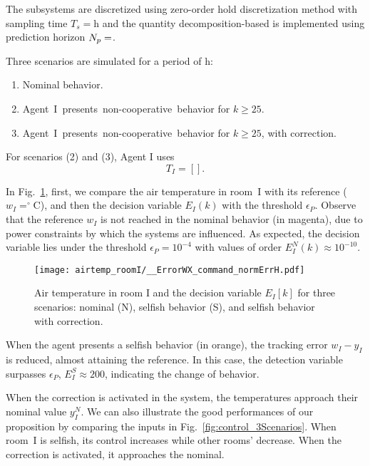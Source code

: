 \documentclass{ifacconf}  %
\begin{document}
The subsystems are discretized using zero-order hold discretization method with sampling time
${T_{s}=\mathrm{h}}$
and the quantity decomposition-based \dmpc{} is implemented using prediction horizon ${N_{p}=}$.

Three scenarios are simulated for a period of $\mathrm{h}$:

  \begin{enumerate}
    \item Nominal behavior.
    \item \mbox{Agent I presents non-cooperative behavior} for ${k\geq25}$.
    \item \mbox{Agent I presents non-cooperative behavior} for ${k\geq25}$, with correction.
  \end{enumerate}

  For scenarios (2) and (3), Agent I uses
  $$T_{I}=\left[\right].$$

In Fig.~\ref{fig:response3Scenarios}, first, we compare the air temperature in room~I
with its reference (${w_{I}=^{\circ}}$C), and then the
decision variable ${E_{I}(k)}$ with the threshold $\epsilon_{P}$.
Observe that the reference $w_{I}$ is not reached in the nominal behavior (in magenta),
due to power constraints by which the systems are influenced.
As expected, the decision variable lies under the threshold ${\epsilon_{P}=10^{-4}}$ with values of order ${E_{I}^{N}(k)\approx10^{-10}}$.
\begin{figure}[h]
  \centering
 \texttt{[image: airtemp\_roomI/\_\_ErrorWX\_command\_normErrH.pdf]}
  \caption{Air temperature in room I and the decision variable $E_{I}[k]$ for three scenarios: nominal (N), selfish behavior (S),
and selfish behavior with correction.}\label{fig:response3Scenarios}
\end{figure}

When the agent presents a selfish behavior (in orange), the tracking error
${w_{I}-y_{I}}$ is reduced, almost attaining the reference.
In this case, the detection variable surpasses $\epsilon_{P}$,
${E_{I}^{S}\approx200}$, indicating the change of behavior.

When the correction is activated in the system, the temperatures approach their nominal value $y_{I}^{N}$.
We can also illustrate the good performances of our proposition by comparing the inputs in Fig.~\ref{fig:control_3Scenarios}.
When room~I is selfish, its control increases while other rooms' decrease. When the correction is activated, it approaches the nominal.
\end{document}
